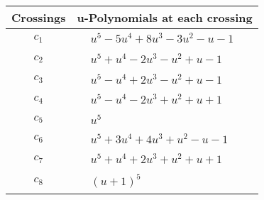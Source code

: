 \documentclass[1p]{elsarticle_modified}
\theoremstyle{definition}
\begin{document}
\begin{tabular}{m{50pt}|m{274pt}}
Crossings & \hspace{64pt}u-Polynomials at each crossing \\
\hline $$\begin{aligned}c_{1}\end{aligned}$$&$\begin{aligned}
&u^5-5 u^4+8 u^3-3 u^2- u-1
\end{aligned}$\\
\hline $$\begin{aligned}c_{2}\end{aligned}$$&$\begin{aligned}
&u^5+u^4-2 u^3- u^2+u-1
\end{aligned}$\\
\hline $$\begin{aligned}c_{3}\end{aligned}$$&$\begin{aligned}
&u^5- u^4+2 u^3- u^2+u-1
\end{aligned}$\\
\hline $$\begin{aligned}c_{4}\end{aligned}$$&$\begin{aligned}
&u^5- u^4-2 u^3+u^2+u+1
\end{aligned}$\\
\hline $$\begin{aligned}c_{5}\end{aligned}$$&$\begin{aligned}
&u^5
\end{aligned}$\\
\hline $$\begin{aligned}c_{6}\end{aligned}$$&$\begin{aligned}
&u^5+3 u^4+4 u^3+u^2- u-1
\end{aligned}$\\
\hline $$\begin{aligned}c_{7}\end{aligned}$$&$\begin{aligned}
&u^5+u^4+2 u^3+u^2+u+1
\end{aligned}$\\
\hline $$\begin{aligned}c_{8}\end{aligned}$$&$\begin{aligned}
&(u+1)^5
\end{aligned}$\\

\end{tabular}
\end{document}
